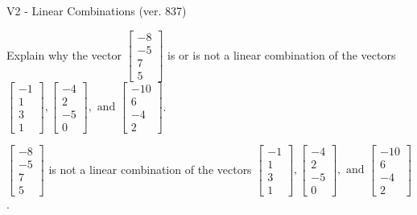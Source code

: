\begin{exercise}
  \begin{exerciseTitle}V2 - Linear Combinations (ver. 837)\end{exerciseTitle}
  \begin{exerciseStatement}
    Explain why the vector \(\left[\begin{array}{c}
-8 \\
-5 \\
7 \\
5
\end{array}\right]\)  is or is not a linear 
	combination of the vectors \(\left[\begin{array}{c}
-1 \\
1 \\
3 \\
1
\end{array}\right] , \left[\begin{array}{c}
-4 \\
2 \\
-5 \\
0
\end{array}\right] , \text{ and } \left[\begin{array}{c}
-10 \\
6 \\
-4 \\
2
\end{array}\right]\).
	


  \end{exerciseStatement}
  \begin{exerciseAnswer}
   \(\left[\begin{array}{c}
-8 \\
-5 \\
7 \\
5
\end{array}\right]\) 
  	 is not  
	a linear combination of the vectors \(\left[\begin{array}{c}
-1 \\
1 \\
3 \\
1
\end{array}\right] , \left[\begin{array}{c}
-4 \\
2 \\
-5 \\
0
\end{array}\right] , \text{ and } \left[\begin{array}{c}
-10 \\
6 \\
-4 \\
2
\end{array}\right]\).

	
  


  \end{exerciseAnswer}
\end{exercise}